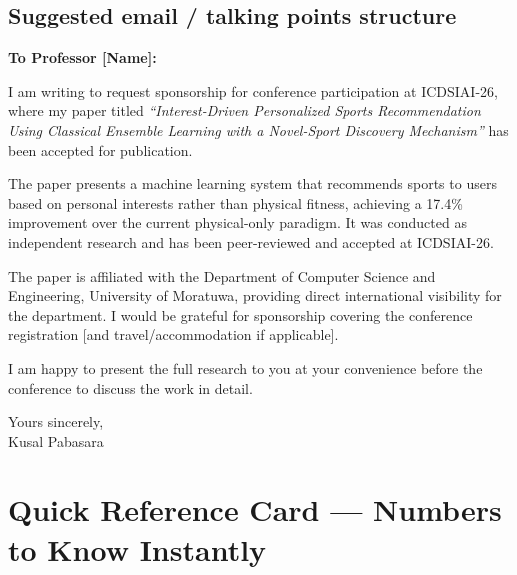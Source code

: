 \documentclass[12pt,a4paper]{article}
\begin{document}
\subsection{Suggested email / talking points structure}

\begin{mdframed}[backgroundcolor=lightgray]
\textbf{To Professor [Name]:}

I am writing to request sponsorship for conference participation at
ICDSIAI-26, where my paper titled \emph{``Interest-Driven Personalized
Sports Recommendation Using Classical Ensemble Learning with a Novel-Sport
Discovery Mechanism''} has been accepted for publication.

The paper presents a machine learning system that recommends sports to users
based on personal interests rather than physical fitness, achieving a 17.4\%
improvement over the current physical-only paradigm. It was conducted as
independent research and has been peer-reviewed and accepted at ICDSIAI-26.

The paper is affiliated with the Department of Computer Science and
Engineering, University of Moratuwa, providing direct international
visibility for the department. I would be grateful for sponsorship
covering the conference registration [and travel/accommodation if applicable].

I am happy to present the full research to you at your convenience before
the conference to discuss the work in detail.

\medskip
Yours sincerely,\\
Kusal Pabasara
\end{mdframed}

\section{Quick Reference Card --- Numbers to Know Instantly}
\end{document}
